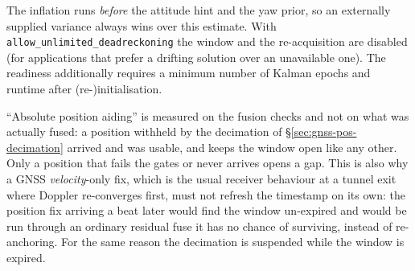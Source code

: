 \documentclass[11pt,a4paper]{article}
\newcommand{\code}[1]{\texttt{#1}}
\begin{document}
The inflation runs \emph{before} the attitude hint and the yaw prior, so
an externally supplied variance always wins over this estimate.
With \code{allow\_\allowbreak{}unlimited\_\allowbreak{}deadreckoning} the window and the
re-acquisition are disabled (for applications that prefer a drifting
solution over an unavailable one). The readiness additionally requires a
minimum number of Kalman epochs and runtime after (re-)initialisation.

``Absolute position aiding'' is measured on the fusion checks and not on what was
actually fused: a position withheld by the decimation of
\S\ref{sec:gnss-pos-decimation} arrived and was usable, and keeps the window
open like any other. Only a position that fails the gates or never arrives opens
a gap. This is also why a GNSS \emph{velocity}-only fix, which is the usual
receiver behaviour at a tunnel exit where Doppler re-converges first, must not
refresh the timestamp on its own: the position fix arriving a beat later would
find the window un-expired and would be run through an ordinary residual fuse it
has no chance of surviving, instead of re-anchoring. For the same reason the
decimation is suspended while the window is expired.
\end{document}
